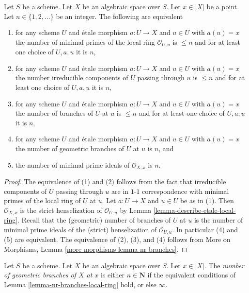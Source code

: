 \begin{lemma}
\label{lemma-nr-branches-local-ring}
Let $S$ be a scheme. Let $X$ be an algebraic space over $S$.
Let $x \in |X|$ be a point. Let $n \in \{1, 2, \ldots\}$ be an integer.
The following are equivalent
\begin{enumerate}
\item for any scheme $U$ and \'etale morphism $a : U \to X$ and
$u \in U$ with $a(u) = x$ the number of minimal primes
of the local ring $\mathcal{O}_{U, u}$ is $\leq n$
and for at least one choice of $U, a, u$ it is $n$,
\item for any scheme $U$ and \'etale morphism $a : U \to X$ and
$u \in U$ with $a(u) = x$ the number irreducible components of
$U$ passing through $u$ is $\leq n$ and for at least one choice
of $U, a, u$ it is $n$,
\item for any scheme $U$ and \'etale morphism $a : U \to X$ and $u \in U$
with $a(u) = x$ the number of branches of $U$ at $u$ is $\leq n$
and for at least one choice of $U, a, u$ it is $n$,
\item for any scheme $U$ and \'etale morphism $a : U \to X$ and $u \in U$
with $a(u) = x$ the number of geometric branches of $U$ at $u$ is $n$, and
\item the number of minimal prime ideals of
$\mathcal{O}_{X, \overline{x}}$ is $n$.
\end{enumerate}
\end{lemma}

\begin{proof}
The equivalence of (1) and (2) follows from the fact that irreducible
components of $U$ passing through $u$ are in $1$-$1$ correspondence with
minimal primes of the local ring of $U$ at $u$. Let $a : U \to X$ and
$u \in U$ be as in (1). Then $\mathcal{O}_{X, \overline{x}}$ is the
strict henselization of $\mathcal{O}_{U, u}$ by
Lemma \ref{lemma-describe-etale-local-ring}. Recall that
the (geometric) number of branches of $U$ at $u$ is the number
of minimal prime ideals of the (strict) henselization of $\mathcal{O}_{U, u}$.
In particular (4) and (5) are equivalent.
The equivalence of (2), (3), and (4) follows from
More on Morphisms, Lemma \ref{more-morphisms-lemma-nr-branches}.
\end{proof}

\begin{definition}
\label{definition-number-of-geometric-branches}
Let $S$ be a scheme.
Let $X$ be an algebraic space over $S$.
Let $x \in |X|$. The {\it number of geometric branches of $X$ at $x$} is
either $n \in \mathbf{N}$ if the equivalent conditions
of Lemma \ref{lemma-nr-branches-local-ring}
hold, or else $\infty$.
\end{definition}








